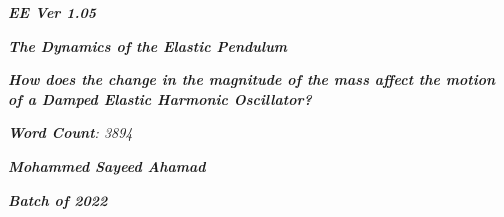 

\begin{titlepage}
    \begin{center}
        \vspace*{1cm}
            
        \date{}
            
        \huge
            
        \textit{\textbf{EE Ver 1.05}}
            
        \vspace{0.25cm}
            
        \hline
            
        \vspace{2.5cm}
            
        \textit{\textbf{The Dynamics of the Elastic Pendulum}}
            
        \vspace{1cm}
            
        \LARGE
            
        \textit{\textbf{How does the change in the magnitude of the mass affect the motion of a Damped Elastic Harmonic Oscillator? }}
            
        \vspace{2.5cm}
            
        \Large
            
		\textit{\textbf{Word Count}: 3894}            

		\vspace{1cm}            
            
		\Large		
		            
        \textit{\textbf{Mohammed Sayeed Ahamad}}
            
        \vspace{2cm}
            
        \Large
            
        \textit{\textbf{Batch of 2022}}
            
        \vspace{0.25cm}
            
        \hline
           
            
    \end{center}
\end{titlepage}



